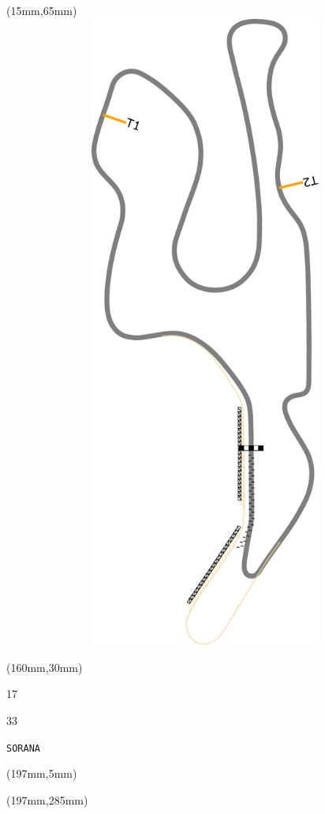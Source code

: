 \begin{textblock*}{185mm}(15mm,65mm)%
\centering
\mbox{\includegraphics[width=185mm,height=210mm,keepaspectratio]{PT/SORANA.pdf}}
\end{textblock*}
\begin{textblock*}{40mm}(160mm,30mm)%
\Large
\par{} 
\par17 
\par33 
\par\hfill\tiny\tt SORANA\\
\end{textblock*}
\begin{textblock*}{20mm}(197mm,5mm)%
\fbox{\thepage}
\label{SORANA}
\end{textblock*}
\begin{textblock*}{20mm}(197mm,285mm)%
\fbox{\thepage}
\end{textblock*}

